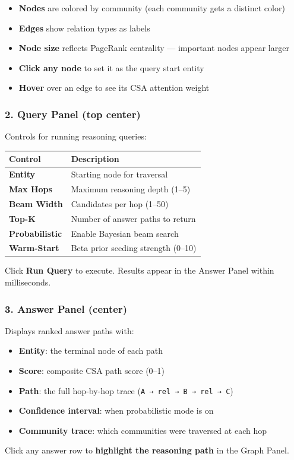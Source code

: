\documentclass[11pt,article,oneside]{memoir}
\begin{document}
\begin{itemize}
\item \textbf{Nodes} are colored by community (each community gets a distinct color)
\item \textbf{Edges} show relation types as labels
\item \textbf{Node size} reflects PageRank centrality — important nodes appear larger
\item \textbf{Click any node} to set it as the query start entity
\item \textbf{Hover} over an edge to see its CSA attention weight

\end{itemize}
\subsubsection{2. Query Panel (top center)}
Controls for running reasoning queries:

\begin{center}
\begin{tabularx}{\columnwidth}{|>{\raggedright\arraybackslash}X|>{\raggedright\arraybackslash}X|}
\hline
Control & Description \\ \hline
\textbf{Entity} & Starting node for traversal \\ \hline
\textbf{Max Hops} & Maximum reasoning depth (1–5) \\ \hline
\textbf{Beam Width} & Candidates per hop (1–50) \\ \hline
\textbf{Top-K} & Number of answer paths to return \\ \hline
\textbf{Probab\-ilistic} & Enable Bayesian beam search \\ \hline
\textbf{Warm-Start} & Beta prior seeding strength (0–10) \\ \hline
\end{tabularx}
\end{center}

Click \textbf{Run Query} to execute. Results appear in the Answer Panel within milli\-seconds.

\subsubsection{3. Answer Panel (center)}
Displays ranked answer paths with:
\begin{itemize}
\item \textbf{Entity}: the terminal node of each path
\item \textbf{Score}: composite CSA path score (0–1)
\item \textbf{Path}: the full hop-by-hop trace (\texttt{A → rel → B → rel → C})
\item \textbf{Confidence interval}: when proba\-bilistic mode is on
\item \textbf{Community trace}: which communities were traversed at each hop

\end{itemize}
Click any answer row to \textbf{highlight the reasoning path} in the Graph Panel.
\end{document}
